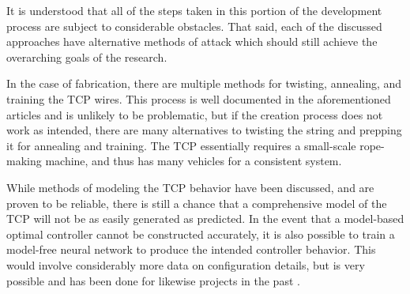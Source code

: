 	It is understood that all of the steps taken in this portion of the development process are subject to considerable obstacles. That said, each of the discussed approaches have alternative methods of attack which should still achieve the overarching goals of the research.

	In the case of fabrication, there are multiple methods for twisting, annealing, and training the TCP wires. This process is well documented in the aforementioned articles and is unlikely to be problematic, but if the creation process does not work as intended, there are many alternatives to twisting the string and prepping it for annealing and training. The TCP essentially requires a small-scale rope-making machine, and thus has many vehicles for a consistent system.
	
	While methods of modeling the TCP behavior have been discussed, and are proven to be reliable, there is still a chance that a comprehensive model of the TCP will not be as easily generated as predicted. In the event that a model-based optimal controller cannot be constructed accurately, it is also possible to train a model-free neural network to produce the intended controller behavior. This would involve considerably more data on configuration details, but is very possible and has been done for likewise projects in the past \cite{yang_efficient_2000, byravan_se3-nets_2017}.